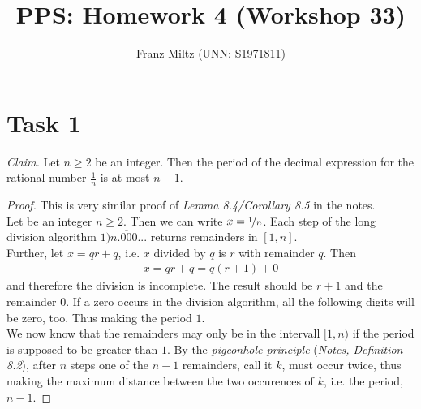 \documentclass{article}
\title{PPS: Homework 4 (Workshop 33)}
\author{Franz Miltz (UNN: S1971811)}
\newcommand*\lneg[1]{\overline{#1}}
\begin{document}
\maketitle
\section*{Task 1}
\emph{Claim.} Let $n\geq 2$ be an integer. Then the period of the decimal expression for the rational number $\frac{1}{n}$ is at most $n-1$.
\begin{proof}
This is very similar proof of \emph{Lemma 8.4/Corollary 8.5} in the notes.\\
Let be an integer $n\geq 2$. Then we can write $x=\nicefrac{1}{n}$. Each step of the long division algorithm $1\lneg{)n.000...}$ returns remainders in $[1,n]$.\\
Further, let $x=qr+q$, i.e. $x$ divided by $q$ is $r$ with remainder $q$. Then
\begin{align*}
  x = qr+q = q(r+1)+0
\end{align*}
and therefore the division is incomplete. The result should be $r+1$ and the remainder $0$. If a zero occurs in the division algorithm, all the following digits will be zero, too. Thus making the period $1$.\\
We now know that the remainders may only be in the intervall $[1, n)$ if the period is supposed to be greater than $1$. By the \emph{pigeonhole principle} (\emph{Notes, Definition 8.2}), after $n$ steps one of the $n-1$ remainders, call it $k$, must occur twice, thus making the maximum distance between the two occurences of $k$, i.e. the period, $n-1$.
 
\end{proof}
\end{document}
